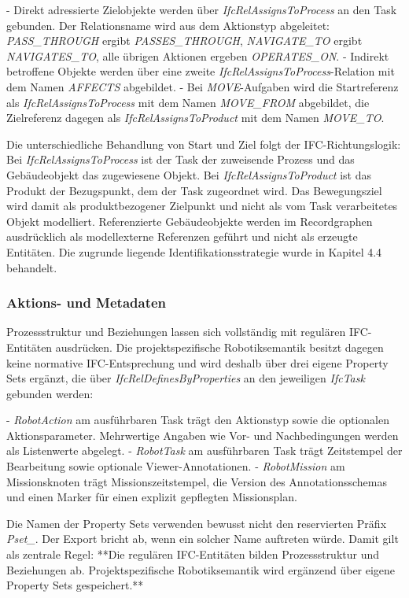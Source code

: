 - Direkt adressierte Zielobjekte werden über \textit{IfcRelAssignsToProcess} an den Task gebunden.
Der Relationsname wird aus dem Aktionstyp abgeleitet: \textit{PASS\_THROUGH} ergibt
\textit{PASSES\_THROUGH}, \textit{NAVIGATE\_TO} ergibt \textit{NAVIGATES\_TO}, alle übrigen Aktionen
ergeben \textit{OPERATES\_ON}.
- Indirekt betroffene Objekte werden über eine zweite \textit{IfcRelAssignsToProcess}-Relation mit dem Namen \textit{AFFECTS} abgebildet.
- Bei \textit{MOVE}-Aufgaben wird die Startreferenz als \textit{IfcRelAssignsToProcess} mit dem
Namen \textit{MOVE\_FROM} abgebildet, die Zielreferenz dagegen als \textit{IfcRelAssignsToProduct}
mit dem Namen \textit{MOVE\_TO}.

Die unterschiedliche Behandlung von Start und Ziel folgt der IFC-Richtungslogik: Bei
\textit{IfcRelAssignsToProcess} ist der Task der zuweisende Prozess und das Gebäudeobjekt das
zugewiesene Objekt. Bei \textit{IfcRelAssignsToProduct} ist das Produkt der Bezugspunkt, dem der
Task zugeordnet wird. Das Bewegungsziel wird damit als produktbezogener Zielpunkt und nicht als vom
Task verarbeitetes Objekt modelliert. Referenzierte Gebäudeobjekte werden im Recordgraphen
ausdrücklich als modellexterne Referenzen geführt und nicht als erzeugte Entitäten. Die zugrunde
liegende Identifikationsstrategie wurde in Kapitel 4.4 behandelt.

\subsubsection{Aktions- und Metadaten}

Prozessstruktur und Beziehungen lassen sich vollständig mit regulären IFC-Entitäten ausdrücken. Die
projektspezifische Robotiksemantik besitzt dagegen keine normative IFC-Entsprechung und wird deshalb
über drei eigene Property Sets ergänzt, die über \textit{IfcRelDefinesByProperties} an den
jeweiligen \textit{IfcTask} gebunden werden:

- \textit{RobotAction} am ausführbaren Task trägt den Aktionstyp sowie die optionalen Aktionsparameter. Mehrwertige Angaben wie Vor- und Nachbedingungen werden als Listenwerte abgelegt.
- \textit{RobotTask} am ausführbaren Task trägt Zeitstempel der Bearbeitung sowie optionale Viewer-Annotationen.
- \textit{RobotMission} am Missionsknoten trägt Missionszeitstempel, die Version des Annotationsschemas und einen Marker für einen explizit gepflegten Missionsplan.

Die Namen der Property Sets verwenden bewusst nicht den reservierten Präfix \textit{Pset\_}. Der
Export bricht ab, wenn ein solcher Name auftreten würde. Damit gilt als zentrale Regel: **Die
regulären IFC-Entitäten bilden Prozessstruktur und Beziehungen ab. Projektspezifische
Robotiksemantik wird ergänzend über eigene Property Sets gespeichert.**

